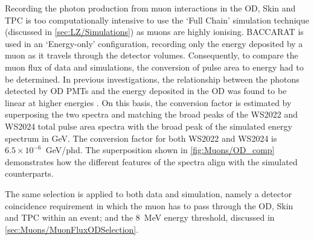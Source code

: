 Recording the photon production from muon interactions in the OD, Skin and TPC is too computationally intensive to use the `Full Chain' simulation technique (discussed in \autoref{sec:LZ/Simulations}) as muons are highly ionising. BACCARAT is used in an `Energy-only' configuration, recording only the energy deposited by a muon as it travels through the detector volumes. Consequently, to compare the muon flux of data and simulations, the conversion of pulse area to energy had to be determined. In previous investigations, the relationship between the photons detected by OD PMTs and the energy deposited in the OD was found to be linear at higher energies \cite{edfraser:thesis}. On this basis, the conversion factor is estimated by superposing the two spectra and matching the broad peaks of the WS2022 and WS2024 total pulse area spectra with the broad peak of the simulated energy spectrum in GeV. The conversion factor for both WS2022 and WS2024 is $6.5\times10^{-6}$~GeV/phd. The superposition shown in \autoref{fig:Muons/OD_comp} demonstrates how the different features of the spectra align with the simulated counterparts.

The same selection is applied to both data and simulation, namely a detector coincidence requirement in which the muon has to pass through the OD, Skin and TPC within an event; and the 8~MeV energy threshold, discussed in \autoref{sec:Muons/MuonFluxODSelection}.

